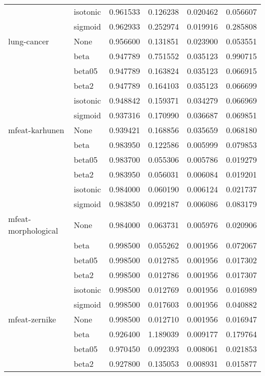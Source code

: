 \begin{tabular}{llrrrr}
        & isotonic &  0.961533 &   0.126238 &  0.020462 &  0.056607 \\
        & sigmoid &  0.962933 &   0.252974 &  0.019916 &  0.285808 \\
lung-cancer & None &  0.956600 &   0.131851 &  0.023900 &  0.053551 \\
        & beta &  0.947789 &   0.751552 &  0.035123 &  0.990715 \\
        & beta05 &  0.947789 &   0.163824 &  0.035123 &  0.066915 \\
        & beta2 &  0.947789 &   0.164103 &  0.035123 &  0.066699 \\
        & isotonic &  0.948842 &   0.159371 &  0.034279 &  0.066969 \\
        & sigmoid &  0.937316 &   0.170990 &  0.036687 &  0.069851 \\
mfeat-karhunen & None &  0.939421 &   0.168856 &  0.035659 &  0.068180 \\
        & beta &  0.983950 &   0.122586 &  0.005999 &  0.079853 \\
        & beta05 &  0.983700 &   0.055306 &  0.005786 &  0.019279 \\
        & beta2 &  0.983950 &   0.056031 &  0.006084 &  0.019201 \\
        & isotonic &  0.984000 &   0.060190 &  0.006124 &  0.021737 \\
        & sigmoid &  0.983850 &   0.092187 &  0.006086 &  0.083179 \\
mfeat-morphological & None &  0.984000 &   0.063731 &  0.005976 &  0.020906 \\
        & beta &  0.998500 &   0.055262 &  0.001956 &  0.072067 \\
        & beta05 &  0.998500 &   0.012785 &  0.001956 &  0.017302 \\
        & beta2 &  0.998500 &   0.012786 &  0.001956 &  0.017307 \\
        & isotonic &  0.998500 &   0.012769 &  0.001956 &  0.016989 \\
        & sigmoid &  0.998500 &   0.017603 &  0.001956 &  0.040882 \\
mfeat-zernike & None &  0.998500 &   0.012710 &  0.001956 &  0.016947 \\
        & beta &  0.926400 &   1.189039 &  0.009177 &  0.179764 \\
        & beta05 &  0.970450 &   0.092393 &  0.008061 &  0.021853 \\
        & beta2 &  0.927800 &   0.135053 &  0.008931 &  0.015877 \\

\end{tabular}
